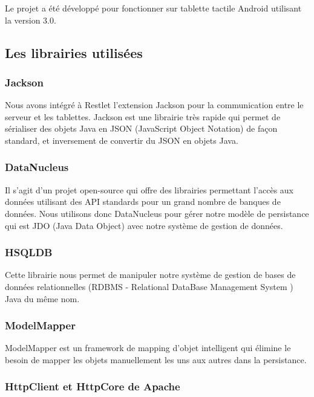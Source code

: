 \documentclass{article}
\begin{document}
Le projet a été développé pour fonctionner sur tablette tactile Android utilisant la version 3.0. 


\subsection{Les librairies utilisées}

\subsubsection{Jackson}

Nous avons intégré à Restlet l'extension Jackson pour la communication entre le serveur et les tablettes. Jackson est une librairie très rapide qui permet de sérialiser des objets Java en JSON (JavaScript Object Notation) de façon standard, et inversement de convertir du JSON en objets Java.

\subsubsection{DataNucleus}

Il s’agit d’un projet open-source qui offre des librairies permettant l'accès aux données utilisant des API standards pour un grand nombre de banques de données. Nous utilisons donc DataNucleus pour gérer notre modèle de persistance qui est JDO (Java Data Object) avec notre système de gestion de données.

\subsubsection{HSQLDB}

Cette librairie nous permet de manipuler notre système de gestion de bases de données     relationnelles (RDBMS - Relational DataBase Management System ) Java du même nom.    

\subsubsection{ModelMapper}

ModelMapper est un framework de mapping d'objet intelligent qui élimine le besoin de mapper les objets manuellement les uns aux autres dans la persistance.    

\subsubsection{HttpClient et HttpCore de Apache}
\end{document}
